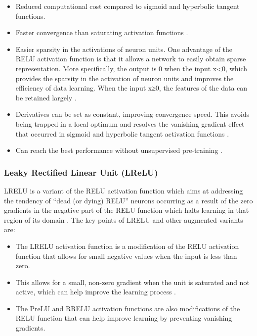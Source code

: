 \begin{itemize}
    \item Reduced computational cost compared to sigmoid and hyperbolic tangent functions.
    \item Faster convergence than saturating activation functions \cite{Hara2015}.
    \item Easier sparsity in the activations of neuron units. One advantage of the \gls{RELU} activation function is that it allows a network to easily obtain sparse representation. More specifically, the output is 0 when the input x<0, which provides the sparsity in the activation of neuron units and improves the efficiency of data learning. When the input x≥0, the features of the data can be retained largely \cite{Hara2015}.
    \item Derivatives can be set as constant, improving convergence speed. This avoids being trapped in a local optimum and resolves the vanishing gradient effect that occurred in sigmoid and hyperbolic tangent activation functions \cite{Fahlman1988}.
    \item Can reach the best performance without unsupervised pre-training \cite{pmlr-v15-glorot11a}.
\end{itemize}

\subsubsection{Leaky Rectified Linear Unit (LReLU)}\label{ssec:leaky_relu}

\gls{LRELU} is a variant of the \gls{RELU} activation function which aims at addressing the tendency of ``dead (or dying) \gls{RELU}'' neurons occurring as a result of the zero gradients in the negative part of the \gls{RELU} function which halts learning in that region of its domain \cite{Hara2015}. The key points of \gls{LRELU} and other augmented variants are:

\begin{itemize}
    \item The \gls{LRELU} activation function is a modification of the \gls{RELU} activation function that allows for small negative values when the input is less than zero.
    \item This allows for a small, non-zero gradient when the unit is saturated and not active, which can help improve the learning process \cite{Maas2013}.
    \item The PreLU and \gls{RRELU} activation functions are also modifications of the \gls{RELU} function that can help improve learning by preventing vanishing gradients.
\end{itemize}

